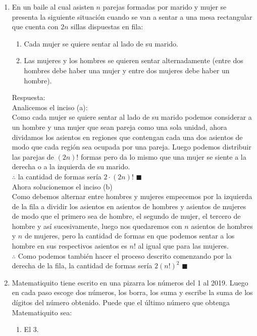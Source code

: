 \documentclass{book}
\begin{document}
\begin{enumerate}
        \item En un baile al cual asisten $n$ parejas formadas por marido y mujer se presenta la siguiente situación cuando se van a sentar a una mesa rectangular que cuenta con $2n$ sillas dispuestas en fila:
        \begin{enumerate}
            \item Cada mujer se quiere sentar al lado de su marido.
            \item Las mujeres y los hombres se quieren sentar alternadamente (entre dos hombres debe haber una mujer y entre dos mujeres debe haber un hombre).
        \end{enumerate}
        Respuesta:\\
        Analicemos el inciso (a):\\
        Como cada mujer se quiere sentar al lado de su marido podemos considerar a un hombre y una mujer que sean pareja como una sola unidad, ahora dividamos los asientos en regiones que contengan cada una dos asientos de modo que cada región sea ocupada por una pareja. Luego podemos distribuir las parejas de $(2n)!$ formas pero da lo mismo que una mujer se siente a la derecha o a la izquierda de su marido.\\
        $\therefore$ la cantidad de formas sería $2\cdot(2n)!$ $\blacksquare$\\
        Ahora solucionemos el inciso (b)\\
        Como debemos alternar entre hombres y mujeres empecemos por la izquierda de la fila a dividir los asientos en asientos de hombres y asientos de mujeres de modo que el primero sea de hombre, el segundo de mujer, el tercero de hombre y así sucesivamente, luego nos quedaremos con $n$ asientos de hombres y $n$ de mujeres, pero la cantidad de formas en que podemos sentar a los hombre en sus respectivos asientos es $n!$ al igual que para las mujeres.\\
        $\therefore$ Como podemos también hacer el proceso descrito comenzando por la derecha de la fila, la cantidad de formas sería $2{(n!)}^2$ $\blacksquare$\\
        \item Matematiquito tiene escrito en una pizarra los números del 1 al 2019. Luego en cada paso escoge dos números, los borra, los suma y escribe la suma de los dígitos del número obtenido. Puede que el último número que obtenga Matematiquito sea:
        \begin{enumerate}
            \item  El 3.

\end{enumerate}
\end{enumerate}
\end{document}
